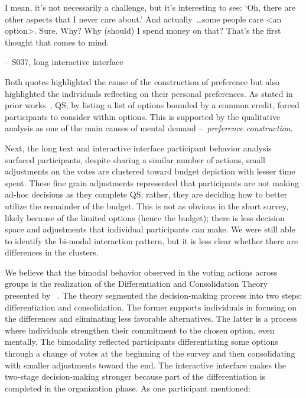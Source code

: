 \begin{displayquote}

I mean, it's not necessarily a challenge, but it's interesting to see: `Oh, there are other aspects that I never care about.' And actually~\ldots some people care <an option>. Sure. Why? Why (should) I spend money on that? That's the first thought that comes to mind.

\noindent \hfill -- S037, long interactive interface
\end{displayquote}

Both quotes highlighted the cause of the construction of preference but also highlighted the individuals reflecting on their personal preferences. As stated in prior works~\cite{chengCanShowWhat2021, naylor2017first}, QS, by listing a list of options bounded by a common credit, forced participants to consider within options. This is supported by the qualitative analysis as one of the main causes of mental demand --~\textit{preference construction}.

Next, the long text and interactive interface participant behavior analysis surfaced participants, despite sharing a similar number of actions, small adjustments on the votes are clustered toward budget depiction with lesser time spent. These fine grain adjustments represented that participants are not making ad-hoc decisions as they complete QS; rather, they are deciding how to better utilize the remainder of the budget. This is not as obvious in the short survey, likely because of the limited options (hence the budget); there is less decision space and adjustments that individual participants can make. We were still able to identify the bi-modal interaction pattern, but it is less clear whether there are differences in the clusters.

We believe that the bimodal behavior observed in the voting actions across groups is the realization of the Differentiation and Consolidation Theory presented by ~\textcite{svensonDifferentiationConsolidationTheory1992}. The theory segmented the decision-making process into two steps: differentiation and consolidation. The former supports individuals in focusing on the differences and eliminating less favorable alternatives. The latter is a process where individuals strengthen their commitment to the chosen option, even mentally. The bimodality reflected participants differentiating some options through a change of votes at the beginning of the survey and then consolidating with smaller adjustments toward the end. The interactive interface makes the two-stage decision-making stronger because part of the differentiation is completed in the organization phase. As one participant mentioned:

